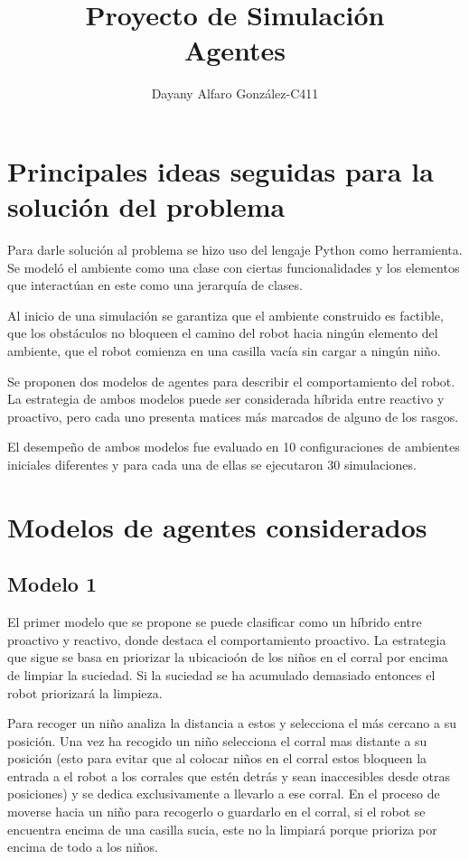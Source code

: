 \documentclass[12pt,a4paper]{article}
\author{Dayany Alfaro Gonz\'alez-C411}
\date{}
\title{Proyecto de Simulaci\'on\\
	Agentes}
\begin{document}
	\maketitle
	\section{Principales ideas seguidas para la soluci\'on del problema}
	Para darle soluci\'on al problema se hizo uso del lengaje Python como herramienta. Se model\'o el ambiente como una clase con ciertas funcionalidades y los elementos que interact\'uan en este como una jerarqu\'ia de clases. 
	
	Al inicio de una simulaci\'on se garantiza que el ambiente construido es factible, que los obst\'aculos no bloqueen el camino del robot hacia ning\'un elemento del ambiente, que el robot comienza en una casilla vac\'ia sin cargar a ning\'un ni\~no. 
	
	Se proponen dos modelos de agentes para describir el comportamiento del robot. La estrategia de ambos modelos puede ser considerada h\'ibrida entre reactivo y proactivo, pero cada uno presenta matices m\'as marcados de alguno de los rasgos. 
	
	El desempe\~no de ambos modelos fue evaluado en 10 configuraciones de ambientes iniciales diferentes y para cada una de ellas se ejecutaron 30 simulaciones.      
	
	\section{Modelos de agentes considerados}	
	\subsection{Modelo 1}
	El primer modelo que se propone se puede clasificar como un h\'ibrido entre proactivo y reactivo, donde destaca el comportamiento proactivo. La estrategia que sigue se basa en priorizar la ubicacio\'on de los niños en el corral por encima de limpiar la suciedad.	Si la suciedad se ha acumulado demasiado entonces el robot priorizará la limpieza.
	
	Para recoger un ni\~no analiza la distancia a estos y selecciona el m\'as cercano a su posici\'on. Una vez ha recogido un ni\~no selecciona el corral mas distante a su posici\'on (esto para evitar que al colocar ni\~nos en el corral estos bloqueen la entrada a el robot a los corrales que est\'en detr\'as y sean inaccesibles desde otras posiciones) y se dedica exclusivamente a llevarlo a ese corral. En el proceso de moverse hacia un ni\~no para recogerlo o guardarlo en el corral, si el robot se encuentra encima de una casilla sucia, este no la limpiará porque prioriza por encima de todo a los ni\~nos.
	
\end{document}
